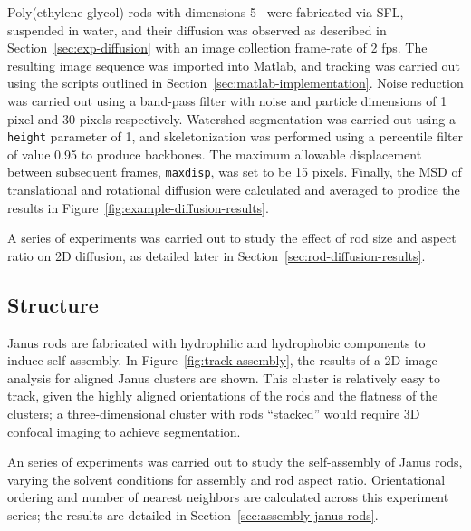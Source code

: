 
Poly(ethylene glycol) rods with dimensions 5   \microns~were fabricated via SFL, suspended in 
water, and their diffusion was observed as described in Section~\ref{sec:exp-diffusion} with an 
image collection
frame-rate of 2 fps.  The resulting image sequence was imported into Matlab, and tracking was carried out
using the scripts outlined in Section~\ref{sec:matlab-implementation}.  Noise reduction was carried out using 
a band-pass filter with noise and particle dimensions of 1 pixel and 30 pixels respectively. 
Watershed segmentation was carried out using a \texttt{height} parameter of 1, and skeletonization
was performed using a percentile filter of value 0.95 to produce backbones.  The maximum allowable 
displacement between subsequent frames, \texttt{maxdisp}, was set to be 15 pixels.  Finally, the 
MSD of translational and rotational diffusion were calculated and averaged to prodice the results in 
Figure~\ref{fig:example-diffusion-results}.

A series of experiments was carried out to study the effect of rod size and aspect ratio on 2D diffusion, as 
detailed later in Section~\ref{sec:rod-diffusion-results}.

\subsection{Structure}


Janus rods are fabricated with hydrophilic and hydrophobic components to induce self-assembly.
In Figure~\ref{fig:track-assembly}, the results of a 2D image analysis for aligned Janus clusters
are shown.  This cluster is relatively easy to track, given the highly aligned orientations of the
rods and the flatness of the clusters; a three-dimensional cluster with rods ``stacked'' would require
3D confocal imaging to achieve segmentation.

An series of experiments was carried out to study the self-assembly of Janus rods, varying
the solvent conditions for assembly and rod aspect ratio.  Orientational ordering and
number of nearest neighbors are calculated across this experiment series; the results are
detailed in Section~\ref{sec:assembly-janus-rods}.
